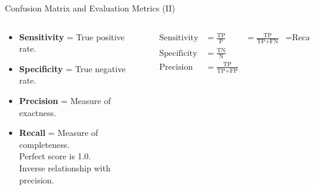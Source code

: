 \begin{frame}{Confusion Matrix and Evaluation Metrics (II)}
	
	\begin{columns}
		\begin{column}{0.4\textwidth}
			\begin{itemize}
				\item \textbf{Sensitivity} = True positive rate.
				\item \textbf{Specificity} = True negative rate.
				\item \textbf{Precision} = Measure of exactness.
				\item \textbf{Recall} = Measure of completeness.\\
				      Perfect score is 1.0.\\
				      Inverse relationship with precision.
			\end{itemize}
		\end{column}

		\begin{column}{0.6\textwidth}
			\begin{align}
				\text{Sensitivity} & = \frac{\text{TP}}{\text{P}}              & = \frac{\text{TP}}{\text{TP} + \text{FN}} & = \text{Recall} \\
				\text{Specificity} & = \frac{\text{TN}}{\text{N}}                                                                            \\
				\text{Precision}   & = \frac{\text{TP}}{\text{TP} + \text{FP}}
			\end{align}
		\end{column}
	\end{columns}
\end{frame}

